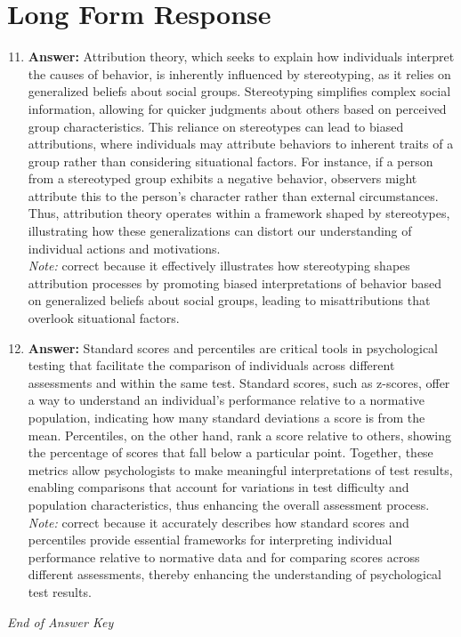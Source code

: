 \documentclass[12pt]{article}
\begin{document}
\section*{Long Form Response}
\begin{enumerate}[label=\arabic*.]
\setcounter{enumi}{10}
\item \textbf{Answer:} Attribution theory, which seeks to explain how individuals interpret the causes of behavior, is inherently influenced by stereotyping, as it relies on generalized beliefs about social groups. Stereotyping simplifies complex social information, allowing for quicker judgments about others based on perceived group characteristics. This reliance on stereotypes can lead to biased attributions, where individuals may attribute behaviors to inherent traits of a group rather than considering situational factors. For instance, if a person from a stereotyped group exhibits a negative behavior, observers might attribute this to the person's character rather than external circumstances. Thus, attribution theory operates within a framework shaped by stereotypes, illustrating how these generalizations can distort our understanding of individual actions and motivations.
\\ \textit{Note:} correct because it effectively illustrates how stereotyping shapes attribution processes by promoting biased interpretations of behavior based on generalized beliefs about social groups, leading to misattributions that overlook situational factors.
\item \textbf{Answer:} Standard scores and percentiles are critical tools in psychological testing that facilitate the comparison of individuals across different assessments and within the same test. Standard scores, such as z-scores, offer a way to understand an individual's performance relative to a normative population, indicating how many standard deviations a score is from the mean. Percentiles, on the other hand, rank a score relative to others, showing the percentage of scores that fall below a particular point. Together, these metrics allow psychologists to make meaningful interpretations of test results, enabling comparisons that account for variations in test difficulty and population characteristics, thus enhancing the overall assessment process.
\\ \textit{Note:} correct because it accurately describes how standard scores and percentiles provide essential frameworks for interpreting individual performance relative to normative data and for comparing scores across different assessments, thereby enhancing the understanding of psychological test results.
\end{enumerate}

\vfill
\noindent\textit{End of Answer Key}
\end{document}
